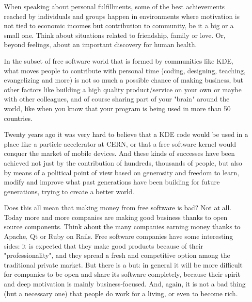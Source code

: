

\noindent{}When speaking about personal fulfillments, some of the best achievements reached by individuals and groups happen in environments where motivation is not tied to economic incomes but contribution to community, be it a big or a small one. Think about situations related to friendship, family or love. Or, beyond feelings, about an important discovery for human health.

In the subset of free software world that is formed by communities like KDE, what moves people to contribute with personal time (coding, designing, teaching, evangelizing and more) is not so much a possible chance of making business, but other factors like building a high quality product/service on your own or maybe with other colleagues, and of course sharing part of your "brain" around the world, like when you know that your program is being used in more than 50 countries.

Twenty years ago it was very hard to believe that a KDE code would be used in a place like a particle accelerator at CERN, or that a free software kernel would conquer the market of mobile devices. And these kinds of successes have been achieved not just by the contribution of hundreds, thousands of people, but also by means of a political point of view based on generosity and freedom to learn, modify and improve what past generations have been building for future generations, trying to create a better world.

Does this all mean that making money from free software is bad? Not at all. Today more and more companies are making good business thanks to open source components. Think about the many companies earning money thanks to Apache, Qt or Ruby on Rails. Free software companies have some interesting sides: it is expected that they make good products because of their "professionality", and they spread a fresh and competitive option among the traditional private market. But there is a but: in general it will be more difficult for companies to be open and share its software completely, because their spirit and deep motivation is mainly business-focused. And, again, it is not a bad thing (but a necessary one) that people do work for a living, or even to become rich.

